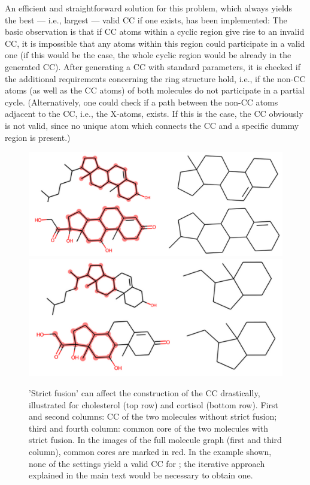 An efficient and straightforward solution for this problem, which always yields the best --- i.e., largest --- valid CC if one exists, has been implemented:
The basic observation is that if CC atoms within a cyclic region give rise to an invalid CC, it is impossible that any atoms within this region could participate in a valid one (if this would be the case, the whole cyclic region would be already in the generated CC).
After generating a CC with standard parameters, it is checked if the additional requirements concerning the ring structure hold, i.e., if the non-CC atoms (as well as the CC atoms) of both molecules do not participate in a partial cycle.
(Alternatively, one could check if a path between the non-CC atoms adjacent to the CC, i.e., the X-atoms, exists. If this is the case, the CC obviously is not valid, since no unique atom which connects the CC and a specific dummy region is present.)





\begin{figure}
\includegraphics[scale=0.45]{sterols_wo_strictfusion}\includegraphics[scale=0.4]{sterols_w_strictfusion}

\caption{'Strict fusion' can affect the construction of the CC drastically, illustrated for cholesterol (top row) and cortisol (bottom row). First and second columns: CC of the two molecules without strict fusion; third and fourth column: common
core of the two molecules with strict fusion. In the images of the full molecule graph (first and third column), common cores are marked in red. In the example shown, none of the settings yield a valid CC for \trafo; the iterative approach explained in the main text would be necessary to obtain one. }
\label{fig:strictfusion}
\end{figure}




